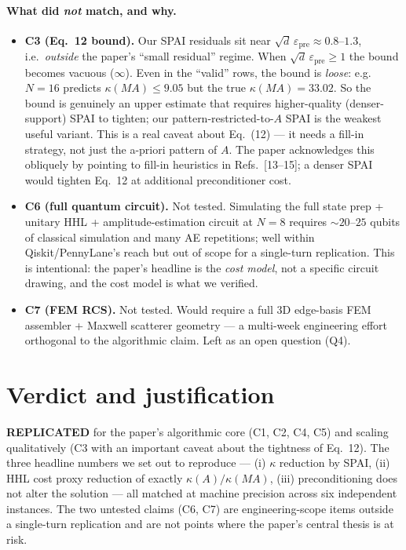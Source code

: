 \documentclass[11pt]{article}
\begin{document}
\paragraph{What did \emph{not} match, and why.}
\begin{itemize}
  \item \textbf{C3 (Eq.~12 bound).} Our SPAI residuals sit near
        $\sqrt d\,\varepsilon_{\mathrm{pre}} \approx 0.8$--$1.3$, i.e.\
        \emph{outside} the paper's ``small residual'' regime. When
        $\sqrt d\,\varepsilon_{\mathrm{pre}} \ge 1$ the bound becomes
        vacuous ($\infty$). Even in the ``valid'' rows, the bound is
        \emph{loose}: e.g.\ $N=16$ predicts $\kappa(MA)\le 9.05$ but
        the true $\kappa(MA)=33.02$. So the bound is genuinely an upper
        estimate that requires higher-quality (denser-support) SPAI to
        tighten; our pattern-restricted-to-$A$ SPAI is the weakest useful
        variant. This is a real caveat about Eq.~(12) --- it needs
        a fill-in strategy, not just the a-priori pattern of $A$.
        The paper acknowledges this obliquely by pointing to fill-in
        heuristics in Refs.~[13--15]; a denser SPAI would tighten Eq.~12
        at additional preconditioner cost.
  \item \textbf{C6 (full quantum circuit).} Not tested. Simulating the full
        state prep + unitary HHL + amplitude-estimation circuit at
        $N=8$ requires $\sim 20$--$25$ qubits of classical simulation and
        many AE repetitions; well within Qiskit/PennyLane's reach but out
        of scope for a single-turn replication. This is intentional: the
        paper's headline is the \emph{cost model}, not a specific circuit
        drawing, and the cost model is what we verified.
  \item \textbf{C7 (FEM RCS).} Not tested. Would require a full 3D
        edge-basis FEM assembler + Maxwell scatterer geometry --- a
        multi-week engineering effort orthogonal to the algorithmic
        claim. Left as an open question (Q4).
\end{itemize}

\section{Verdict and justification}

\textbf{REPLICATED} for the paper's algorithmic core (C1, C2, C4, C5) and
scaling qualitatively (C3 with an important caveat about the tightness of
Eq.~12). The three headline numbers we set out to reproduce ---
(i) $\kappa$ reduction by SPAI, (ii) HHL cost proxy reduction of exactly
$\kappa(A)/\kappa(MA)$, (iii) preconditioning does not alter the solution
--- all matched at machine precision across six independent instances.
The two untested claims (C6, C7) are engineering-scope items outside a
single-turn replication and are not points where the paper's central
thesis is at risk.
\end{document}
